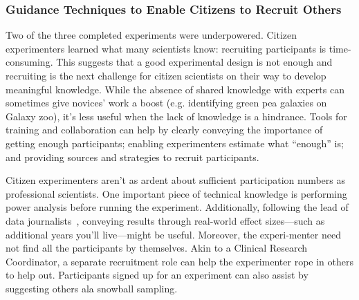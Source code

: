 \subsubsection{Guidance Techniques to Enable Citizens to Recruit Others}
Two of the three completed experiments were underpowered. Citizen experimenters learned what many scientists know: recruiting participants is time-consuming. This suggests that a good experimental design is not enough and recruiting is the next challenge for citizen scientists on their way to develop meaningful knowledge. While the absence of shared knowledge with experts can sometimes give novices’ work a boost (e.g. identifying green pea galaxies on Galaxy zoo), it’s less useful when the lack of knowledge is a hindrance. Tools for training and collaboration can help by clearly conveying the importance of getting enough participants; enabling experimenters estimate what “enough” is; and providing sources and strategies to recruit participants.

Citizen experimenters aren’t as ardent about sufficient participation numbers as professional scientists. One important piece of technical knowledge is performing power analysis before running the experiment. Additionally, following the lead of data journalists~\cite{Gray2012}, conveying results through real-world effect sizes—such as additional years you’ll live—might be useful. Moreover, the experi-menter need not find all the participants by themselves. Akin to a Clinical Research Coordinator, a separate recruitment role can help the experimenter rope in others to help out. Participants signed up for an experiment can also assist by suggesting others ala snowball sampling.

